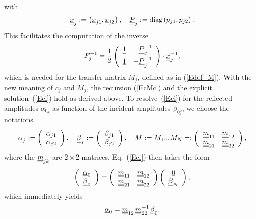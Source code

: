 with
\begin{equation}
  \underline{\underline{x}}_j :=
  \left(\underline{x}_{j1}, \underline{x}_{j2}\right),
  \quad
  \underline{\underline{P}}_j :=
  \text{diag}\left(p_{j1},p_{j2}\right).
\end{equation}
This facilitates the computation of the inverse
\begin{equation}
  F_j^{-1}
    = \frac{1}{2}
    \left(\begin{array}{cc}\underline{\underline{1}}&\hphantom{-}\underline{\underline{P}}_j^{-1}\\[1.2ex]
      \underline{\underline{1}} &-\underline{\underline{P}}_j^{-1}\end{array}\right)
      \cdot\underline{\underline{x}}_j^{-1},
\end{equation}
which is needed for the transfer matrix $M_j$,
defined as in (\ref{Edef_M}).
With the new meaning of $c_j$ and $M_j$,
the recursion (\ref{EcMc}) and the explicit solution~(\ref{Eci})
hold as derived above.
To resolve~(\ref{Eci}) for the reflected amplitudes $\alpha_{0j}$
as function of the incident amplitudes $\beta_{0j}$,
we choose the notations
\begin{equation}
  \u\alpha_j
  :=\left(\begin{array}{c}\alpha_{j1}\\\alpha_{j2}\end{array}\right),\quad
  \u\beta_j
  :=\left(\begin{array}{c}\beta_{j1}\\\beta_{j2}\end{array}\right),\quad
  M:=M_1 ... M_N %
  =:\left(\begin{array}{cc}\uu m_{11}&\uu m_{12}\\
                           \uu m_{21}&\uu m_{22}\end{array}\right),
\end{equation}
where the $\underline{\underline{m}}_{jk}$ are $2\times2$ matrices.
Eq.~(\ref{Eci}) then takes the form
\begin{equation}
  \left(\begin{array}{c}\underline{\alpha}_{0}\\\underline{\beta}_{0}\end{array}\right)
  = 
  \left(\begin{array}{cc}\underline{\underline{m}}_{11}&\underline{\underline{m}}_{12}\\
    \underline{\underline{m}}_{21}&\underline{\underline{m}}_{22}\end{array}\right)
  \left(\begin{array}{c}\underline{0}\\\underline{\beta}_{N}\end{array}\right),
\end{equation}
which immediately yields
\begin{equation}
  \underline{\alpha}_0 = \underline{\underline{m}}_{12}\,\underline{\underline{m}}_{22}^{-1}\,\underline{\beta}_0.
\end{equation}

%
